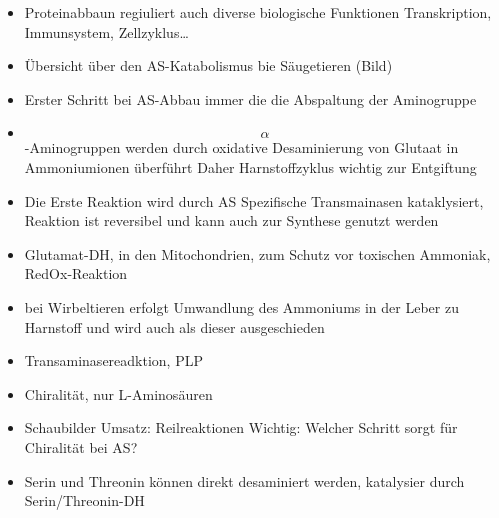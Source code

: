 \documentclass{article}
\begin{document}
\begin{itemize}
	\\ \hline
	\item Proteinabbaun regiuliert auch diverse biologische Funktionen
	\textrightarrow Transkription, Immunsystem, Zellzyklus\dots
	\\ \hline
	\item Übersicht über den AS-Katabolismus bie Säugetieren (Bild)
	\item Erster Schritt bei AS-Abbau immer die die Abspaltung der Aminogruppe %
	\item $$\alpha$$-Aminogruppen werden durch oxidative Desaminierung von Glutaat in Ammoniumionen überführt
		\textrightarrow Daher Harnstoffzyklus wichtig zur Entgiftung
	\\ \hline
	\item Die Erste Reaktion wird durch AS Spezifische Transmainasen kataklysiert,
		Reaktion ist reversibel und kann auch zur Synthese genutzt werden
	\item Glutamat-DH, in den Mitochondrien, zum Schutz vor toxischen Ammoniak, RedOx-Reaktion
	\item bei Wirbeltieren erfolgt Umwandlung des Ammoniums in der Leber zu Harnstoff und wird auch als 
		dieser ausgeschieden
	\\ \hline
	\item Transaminasereadktion, PLP
	\item Chiralität, nur L-Aminosäuren
	\item Schaubilder Umsatz: Reilreaktionen
		Wichtig: Welcher Schritt sorgt für Chiralität bei AS?
		\\ \hline 
	\item Serin und Threonin können direkt desaminiert werden, katalysier durch Serin/Threonin-DH
\end{itemize}
\end{document}
